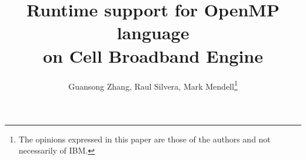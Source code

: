 
\date{}      %

\title{Runtime support for OpenMP language \\ on Cell Broadband Engine}

\author{Guansong Zhang, Raul Silvera, Mark Mendell\thanks{The
    opinions expressed in this paper are those of the authors and not
    necessarily of IBM.}  }






\maketitle

\thispagestyle{empty}

